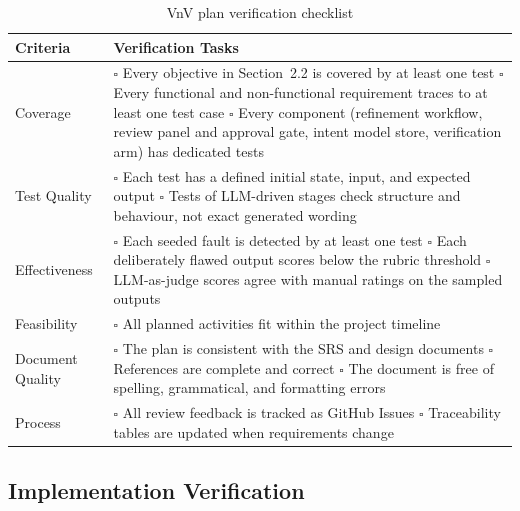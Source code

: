 \documentclass[12pt, titlepage]{article}
\begin{document}
\begin{table}[H]
  \centering
  \renewcommand{\arraystretch}{1.3}
  \begin{tabularx}{\textwidth}{|>{\raggedright\arraybackslash}p{3.5cm}|>{\raggedright\arraybackslash}X|}
  \hline
  \textbf{Criteria} & \textbf{Verification Tasks} \\
  \hline
  Coverage &
  $\square$ Every objective in Section~2.2 is covered by at least one
  test \newline
  $\square$ Every functional and non-functional requirement traces to at
  least one test case \newline
  $\square$ Every component (refinement workflow, review panel and
  approval gate, intent model store, verification arm) has dedicated
  tests \\
  \hline
  Test Quality &
  $\square$ Each test has a defined initial state, input, and expected
  output \newline
  $\square$ Tests of LLM-driven stages check structure and behaviour,
  not exact generated wording \\
  \hline
  Effectiveness &
  $\square$ Each seeded fault is detected by at least one test
  \newline
  $\square$ Each deliberately flawed output scores below the rubric
  threshold \newline
  $\square$ LLM-as-judge scores agree with manual ratings on the sampled
  outputs \\
  \hline
  Feasibility &
  $\square$ All planned activities fit within the project timeline \\ 
  \hline
  Document Quality &
  $\square$ The plan is consistent with the SRS and design documents
  \newline
  $\square$ References are complete and correct \newline
  $\square$ The document is free of spelling, grammatical, and
  formatting errors \\
  \hline
  Process &
  $\square$ All review feedback is tracked as GitHub Issues \newline
  $\square$ Traceability tables are updated when requirements change \\
  \hline
  \end{tabularx}
  \caption{VnV plan verification checklist}
  \label{tab:vnv-checklist}
  \end{table}


\subsection{Implementation Verification}
\end{document}
